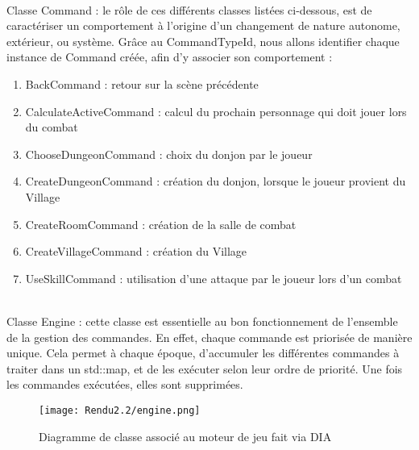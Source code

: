 \documentclass[a4paper,12pt]{article}
\begin{document}
\\ \indent Classe Command : le rôle de ces différents classes listées ci-dessous, est de caractériser un comportement à l'origine d'un changement de nature autonome, extérieur, ou système. Grâce au CommandTypeId, nous allons identifier chaque instance de Command créée, afin d'y associer son comportement : 
\begin{enumerate}
    \item BackCommand : retour sur la scène précédente
    \item CalculateActiveCommand : calcul du prochain personnage qui doit jouer lors du combat 
    \item ChooseDungeonCommand : choix du donjon par le joueur
    \item CreateDungeonCommand : création du donjon, lorsque le joueur provient du Village
    \item CreateRoomCommand : création de la salle de combat 
    \item CreateVillageCommand : création du Village
    \item UseSkillCommand : utilisation d'une attaque par le joueur lors d'un combat
\end{enumerate}

\\ \indent Classe Engine : cette classe est essentielle au bon fonctionnement de l'ensemble de la gestion des commandes. En effet, chaque commande est priorisée de manière unique. Cela permet à chaque époque, d'accumuler les différentes commandes à traiter dans un std::map, et de les exécuter selon leur ordre de priorité. Une fois les commandes exécutées, elles sont supprimées.

\begin{figure}[!ht]
  \centering
  \texttt{[image: Rendu2.2/engine.png]}
  \caption{Diagramme de classe associé au moteur de jeu fait via DIA}
\end{figure}
\end{document}
